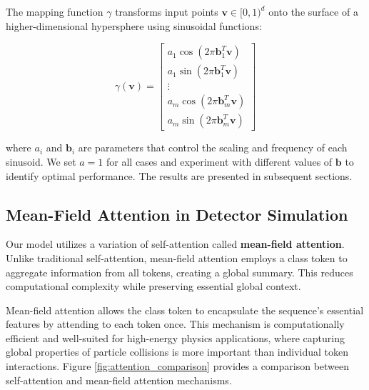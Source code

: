 The mapping function \( \gamma \) transforms input points \( \mathbf{v} \in [0, 1)^d \) onto the surface of a higher-dimensional hypersphere using sinusoidal functions:

\begin{equation}
\gamma(\mathbf{v}) = 
\begin{bmatrix}
a_1 \cos(2 \pi \mathbf{b}_1^T \mathbf{v}) \\ 
a_1 \sin(2 \pi \mathbf{b}_1^T \mathbf{v}) \\ 
\vdots \\ 
a_m \cos(2 \pi \mathbf{b}_m^T \mathbf{v}) \\ 
a_m \sin(2 \pi \mathbf{b}_m^T \mathbf{v})
\end{bmatrix}
\end{equation}

where \( a_i \) and \( \mathbf{b}_i \) are parameters that control the scaling and frequency of each sinusoid. We set \( a = 1 \) for all cases and experiment with different values of \( \mathbf{b} \) to identify optimal performance. The results are presented in subsequent sections.

\subsection{Mean-Field Attention in Detector Simulation}
Our model utilizes a variation of self-attention called \textbf{mean-field attention}. Unlike traditional self-attention, mean-field attention employs a class token to aggregate information from all tokens, creating a global summary. This reduces computational complexity while preserving essential global context.

Mean-field attention allows the class token to encapsulate the sequence's essential features by attending to each token once. This mechanism is computationally efficient and well-suited for high-energy physics applications, where capturing global properties of particle collisions is more important than individual token interactions. Figure \ref{fig:attention_comparison} provides a comparison between self-attention and mean-field attention mechanisms.

